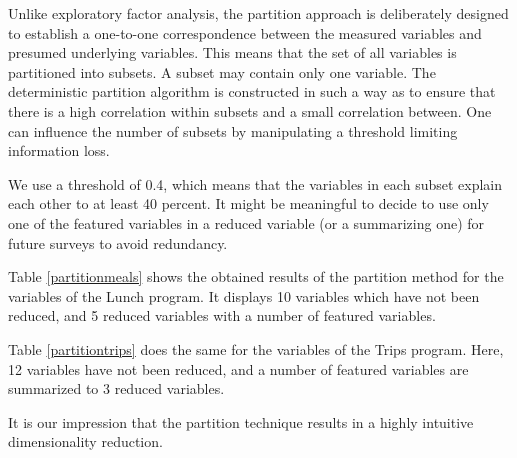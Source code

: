 \documentclass[12pt, a4paper, titlepage]{article}\usepackage[]{graphicx}\usepackage[]{color}
\begin{document}
Unlike exploratory factor analysis, the partition approach is deliberately designed to establish a one-to-one correspondence between the measured variables and presumed underlying variables. This means that the set of all variables is partitioned into subsets. A subset may contain only one variable. The deterministic partition algorithm is constructed in such a way as to ensure that there is a high correlation within subsets and a small correlation between. One can influence the number of subsets by manipulating a threshold limiting information loss. 

We use a threshold of 0.4, which means that the variables in each subset explain each other to at least 40 percent. It might be meaningful to decide to use only one of the featured variables in a reduced variable (or a summarizing one) for future surveys to avoid redundancy.

Table \ref{partitionmeals} shows the obtained results of the partition method for the variables of the Lunch program. It displays 10 variables which have not been reduced, and 5 reduced variables with a number of featured variables.

Table \ref{partitiontrips} does the same for the variables of the Trips program. Here, 12 variables have not been reduced, and a number of featured variables are summarized to 3 reduced variables. 

It is our impression that the partition technique results in a highly intuitive dimensionality reduction.
\end{document}
